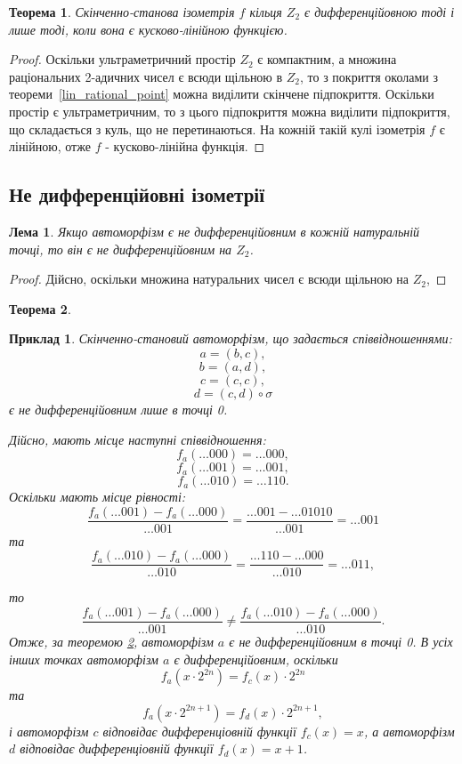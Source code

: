 \documentclass[a4paper,12pt]{article} \usepackage{a4wide}
\numberwithin{equation}{subsection}
\newtheorem{theorem}{Теорема}[subsection]
\newtheorem{lemma}{Лема}[subsection]
\newtheorem{example}{Приклад}[subsection]
\begin{document}
 \begin{theorem}\label{sec:-fundtheorem}
   Скінченно-станова ізометрія $f$ кільця $Z_2$ є дифференційовною
   тоді і лише тоді, коли вона є кусково-лінійною функцією.
 \end{theorem}
 \begin{proof}
   Оскільки ультраметричний простір $Z_2$ є компактним, а множина
   раціональних 2-адичних чисел є всюди щільною в $Z_2$, то з покриття
   околами з теореми~\ref{lin_rational_point} можна виділити скінчене
   підпокриття. Оскільки простір є ультраметричним, то з цього
   підпокриття можна виділити підпокриття, що складається з куль, що
   не перетинаються. На кожній такій кулі ізометрія $f$ є лінійною,
   отже $f$ - кусково-лінійна функція.
 \end{proof}
\subsection{Не дифференційовні ізометрії}
\begin{lemma}\label{naturalDiff}
Якщо автоморфізм є не дифференційовним в кожній натуральній точці, то він є не дифференційовним на $Z_2$.
\end{lemma}
\begin{proof}
Дійсно, оскільки множина натуральних чисел є всюди щільною на $Z_2$, 
\end{proof}

\begin{theorem}\label{notDiff}

\end{theorem}

\begin{example}\label{onePointDiffAuto1}
Скінченно-становий автоморфізм, що задається співвідношеннями:
$$a=(b,c),$$ 
$$b=(a,d),$$ 
$$c =(c,c),$$ 
$$d=(c,d)\circ \sigma$$
є не дифференційовним лише в точці 0.

Дійсно, мають місце наступні співвідношення:
$$f_a(\dots 000) = \dots 000,$$
$$f_a(\dots 001) = \dots 001,$$
$$f_a(\dots 010) = \dots 110.$$
Оскільки мають місце рівності:
$$\frac{f_a(\dots 001) - f_a(\dots 000) }{\dots 001} = \frac{\dots 001 - \dots 01010 }{\dots 001} = \dots 001  $$
та
$$\frac{f_a(\dots 010) - f_a(\dots 000) }{\dots 010} = \frac{\dots 110 - \dots 000}{\dots 010}  = \dots 011, $$

то $$\frac{f_a(\dots 001) - f_a(\dots 000) }{\dots 001} \neq \frac{f_a(\dots 010) - f_a(\dots 000) }{\dots 010}. $$
Отже, за теоремою \ref{notDiff}, автоморфізм $a$ є не дифференційовним в точці 0.
В усіх інших точках автоморфізм $a$ є дифференційовним, оскільки 
$$f_a(x\cdot 2^{2n}) = f_c(x)\cdot 2^{2n} $$
та
$$f_a(x\cdot 2^{2n+1}) = f_d(x)\cdot 2^{2n+1}, $$
і автоморфізм $c$ відповідає дифференціовній функції $f_c(x)=x$,
а автоморфізм $d$ відповідає дифференціовній функції $f_d(x)=x+1$.
\end{example}
\end{document}
